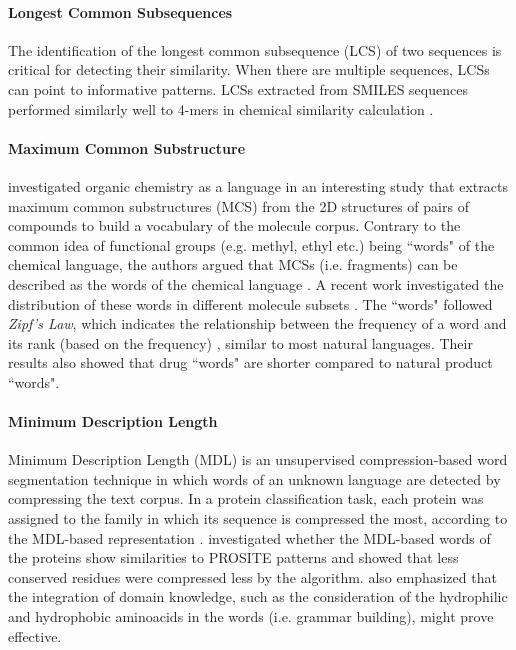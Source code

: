 \documentclass[review]{elsarticle}
\begin{document}
\paragraph{Longest Common Subsequences} The identification of the longest common subsequence (LCS) of two sequences is critical for detecting their similarity. When there are multiple sequences, LCSs can point to informative patterns. LCSs extracted from SMILES sequences performed similarly well to $4$-mers in chemical similarity calculation  \cite{ozturk2016comparative}. 


\paragraph{Maximum Common Substructure} \citet{cadeddu2014organic} investigated  organic chemistry as a language in an interesting study that extracts maximum common substructures (MCS) from the 2D structures of pairs of compounds to build a vocabulary of the molecule corpus. Contrary to the common idea of functional groups (e.g. methyl, ethyl etc.) being ``words" of the chemical language, the authors argued that  MCSs (i.e. fragments) can be described as the words of the chemical language \cite{cadeddu2014organic}.  A recent work investigated the distribution of these words in different molecule subsets \cite{wozniak2018linguistic}.  The ``words" followed \textit{Zipf's Law}, which indicates the relationship between the frequency of a word and its rank (based on the frequency) \cite{zipf1949human}, similar to most natural languages. Their results also showed that drug ``words" are shorter compared to natural product ``words". 


\paragraph{Minimum Description Length} 
Minimum Description Length (MDL) is an unsupervised compression-based word segmentation technique in which words of an unknown language are detected by compressing the text corpus. In a protein classification task, each protein was assigned to the family in which its sequence is compressed the most, according to the MDL-based representation \cite{ganesan2017protein}.  \citet{ganesan2017protein} investigated whether the MDL-based words of the proteins show similarities to PROSITE patterns \cite{hulo2006prosite} and showed that less conserved residues  were compressed less by the algorithm.  \citet{ganesan2017protein} also emphasized that the integration of domain knowledge, such as the consideration of the hydrophilic and hydrophobic aminoacids in the words  (i.e. grammar building), might prove effective. 
\end{document}
